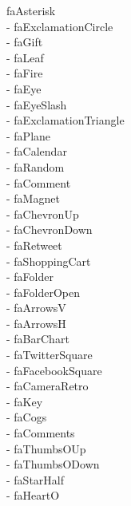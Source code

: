 \documentclass[%
               doublesided,
               paper=a4,
               fontsize=10pt
              ]{my-resume}
\begin{document}
faAsterisk\\ \faExclamationCircle - faExclamationCircle\\ \faGift - faGift\\ \faLeaf - faLeaf\\ \faFire - faFire\\ \faEye - faEye\\ \faEyeSlash - faEyeSlash\\ \faExclamationTriangle - faExclamationTriangle\\ \faPlane - faPlane\\ \faCalendar - faCalendar\\ \faRandom - faRandom\\ \faComment - faComment\\ \faMagnet - faMagnet\\ \faChevronUp - faChevronUp\\ \faChevronDown - faChevronDown\\ \faRetweet - faRetweet\\ \faShoppingCart - faShoppingCart\\ \faFolder - faFolder\\ \faFolderOpen - faFolderOpen\\ \faArrowsV - faArrowsV\\ \faArrowsH - faArrowsH\\ \faBarChart - faBarChart\\ \faTwitterSquare - faTwitterSquare\\ \faFacebookSquare - faFacebookSquare\\ \faCameraRetro - faCameraRetro\\ \faKey - faKey\\ \faCogs - faCogs\\ \faComments - faComments\\ \faThumbsOUp - faThumbsOUp\\ \faThumbsODown - faThumbsODown\\ \faStarHalf - faStarHalf\\ \faHeartO - faHeartO\\ \faSignOut 
\end{document}
